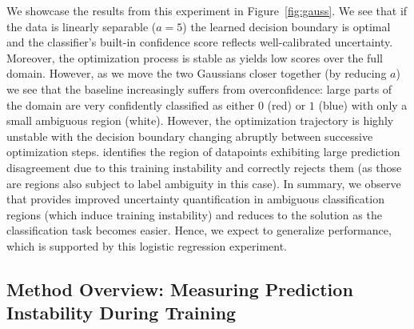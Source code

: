 We showcase the results from this experiment in Figure~\ref{fig:gauss}. We  see that if the data is linearly separable ($a=5$) the learned decision boundary is optimal and the classifier's built-in confidence score \sr reflects well-calibrated uncertainty. Moreover, the optimization process is stable as \sptd yields low scores over the full domain. However, as we move the two Gaussians closer together (\ie by reducing $a$) we see that the \sr baseline increasingly suffers from overconfidence: large parts of the domain are very confidently classified as either $0$ (red) or $1$ (blue) with only a small ambiguous region (white). However, the optimization trajectory is highly unstable with the decision boundary changing abruptly between successive optimization steps. \sptd identifies the region of datapoints exhibiting large prediction disagreement due to this training instability and correctly rejects them (as those are regions also subject to label ambiguity in this case). In summary, we observe that \sptd provides improved uncertainty quantification in ambiguous classification regions (which induce training instability) and reduces to the \sr solution as the classification task becomes easier. Hence, we expect \sptd to generalize \sr performance, which is supported by this logistic regression experiment.

\subsection{Method Overview: Measuring Prediction Instability During Training}
\label{sec:method_overview}

